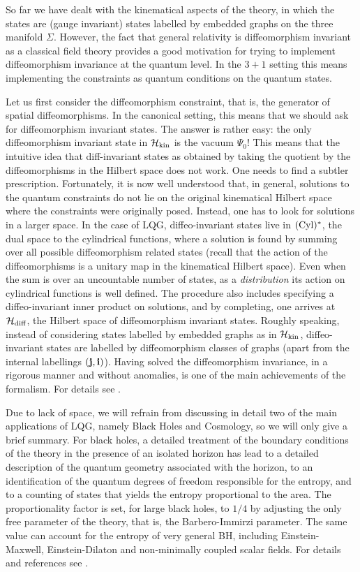 \documentclass[aps,prd,tightenlines,showpacs,nofootinbib,preprint]{revtex4}
\begin{document}
So far we have dealt with the kinematical aspects of the theory,
in which the states are (gauge invariant) states labelled by
embedded graphs on the three manifold $\Sigma$. However, the fact
that general relativity is diffeomorphism invariant as a classical
field theory provides a good motivation for trying to implement
diffeomorphism invariance at the quantum level. In the $3+1$
setting this means implementing the constraints as quantum
conditions on the quantum states.

Let us first consider the diffeomorphism constraint, that is, the
generator of spatial diffeomorphisms. In the canonical setting,
this means that we should ask for diffeomorphism invariant states.
The answer is rather easy: the only diffeomorphism invariant state
in ${\cal H}_{\rm kin}$ is the vacuum $\Psi_0$! This means that
the intuitive idea that diff-invariant states as obtained by
taking the quotient by the diffeomorphisms in the Hilbert space
does not work. One needs to find a subtler prescription.
Fortunately, it is now well understood that, in general, solutions
to the quantum constraints do not lie on the original kinematical
Hilbert space where the constraints were originally posed.
Instead, one has to look for solutions in a larger space. In the
case of LQG, diffeo-invariant states live  in $({\rm Cyl})^*$, the
dual space to the cylindrical functions, where a solution is found
by summing over all possible diffeomorphism related states (recall
that the action of the diffeomorphisms is a unitary map in the
kinematical Hilbert space). Even when the sum is over an
uncountable number of states, as a {\it distribution} its action
on cylindrical functions is well defined. The procedure also
includes specifying a diffeo-invariant inner product on solutions,
and by completing, one arrives at ${\cal H}_{\rm diff}$, the
Hilbert space of diffeomorphism invariant states. Roughly
speaking, instead of considering states labelled by embedded
graphs as in ${\cal H}_{\rm kin}$, diffeo-invariant states are
labelled by diffeomorphism classes of graphs (apart from the
internal labellings $(\bf{j},\bf{i})$). Having solved the
diffeomorphism invariance, in a rigorous manner and without
anomalies, is one of the main achievements of the formalism. For
details see \cite{AL:review}.



Due to lack of space, we will refrain from discussing in detail
two of the main applications of LQG, namely Black Holes and
Cosmology, so we will only give a brief summary. For black holes,
a detailed treatment of the boundary conditions of the theory in
the presence of an isolated horizon has lead to a detailed
description of the quantum geometry associated with the horizon,
to an identification of the quantum degrees of freedom responsible
for the entropy, and to a counting of states that yields the
entropy proportional to the area. The proportionality factor is
set, for large black holes, to $1/4$ by adjusting the only free
parameter of the theory, that is, the Barbero-Immirzi parameter.
The same value can account for the entropy of very general BH,
including Einstein-Maxwell, Einstein-Dilaton and non-minimally
coupled scalar fields. For details and references see
\cite{AL:review}.
\end{document}
